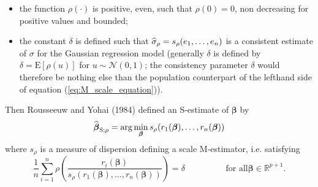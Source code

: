\begin{itemize}
\item the function $\rho\left(  \cdot\right)  $ is positive, even, such that
$\rho\left(  0\right)  =0$, non decreasing for positive values and bounded;

\item the constant $\delta$ is defined such that $\sthat{\sigma}_{\rho
}=s_{\rho}\left(  e_{1},\ldots,e_{n}\right)  $ is a consistent estimate of
$\sigma$ for the Gaussian regression model (generally $\delta$ is defined by
$\delta=\mathrm{E}\left[  \rho\left(  u\right)  \right]  $ for $u\sim
\mathcal{N}(0,1)$; the consistency parameter $\delta$ would therefore be
nothing else than the population counterpart of the lefthand side of equation
(\ref{eq:M_scale_equation})).
\end{itemize}

Then Rousseeuw and Yohai (1984) defined an S-estimate of $\boldsymbol\beta$
by
\[
\sthat{\boldsymbol\beta}_{\mathrm{S};\rho}=\arg\min_{\boldsymbol\beta%
}s_{\rho}\left(  r_{1}(\boldsymbol\beta),\ldots,r_{n}(\boldsymbol{\beta
})\right)
\]
where $s_{\rho}$ is a measure of dispersion defining a scale M-estimator, i.e.
satisfying
\begin{equation}
\frac{1}{n}\sum_{i=1}^{n}\rho\left(  \frac{r_{i}\left(  \boldsymbol{\beta
}\right)  }{s_{\rho}\left(  r_{1}(\boldsymbol\beta),\ldots,r_{n}%
(\boldsymbol\beta)\right)  }\right)  =\delta\hspace{2cm}\text{for all
}\boldsymbol\beta\in\mathbb{R}^{p+1}. \label{eq:M_scale_equation_res}%
\end{equation}


